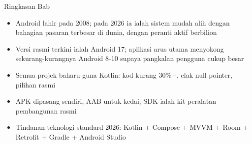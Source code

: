 \begin{tcbsummary}{Ringkasan Bab}
\begin{itemize}
  \item Android lahir pada 2008; pada 2026 ia ialah sistem mudah alih dengan bahagian pasaran terbesar di dunia, dengan peranti aktif berbilion
  \item Versi rasmi terkini ialah Android 17; aplikasi arus utama menyokong sekurang-kurangnya Android 8-10 supaya pangkalan pengguna cukup besar
  \item Semua projek baharu guna Kotlin: kod kurang 30\%+, elak null pointer, pilihan rasmi
  \item APK dipasang sendiri, AAB untuk kedai; SDK ialah kit peralatan pembangunan rasmi
  \item Tindanan teknologi standard 2026: Kotlin + Compose + MVVM + Room + Retrofit + Gradle + Android Studio
\end{itemize}

\end{tcbsummary}
